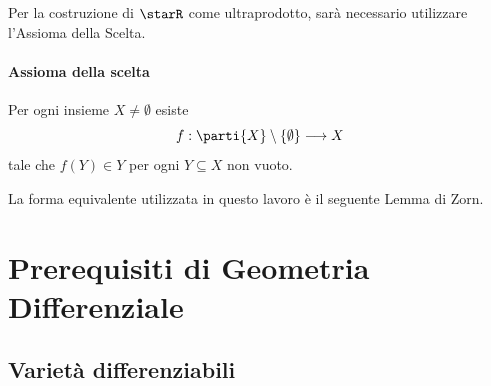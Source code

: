 Per la costruzione di $ \starR $ come ultraprodotto, sarà necessario utilizzare l'Assioma della Scelta. 

\paragraph{Assioma della scelta} Per ogni insieme $ X\neq \emptyset $ esiste \[f:\parti{X}\setminus\{\emptyset\}\longrightarrow X\]tale che $ f(Y) \in Y $ per ogni $ Y \subseteq X $ non vuoto.

La forma equivalente utilizzata in questo lavoro è il seguente Lemma di Zorn.



\section{Prerequisiti di Geometria Differenziale}\label{sec:geodiff}

\subsection{Varietà differenziabili}

